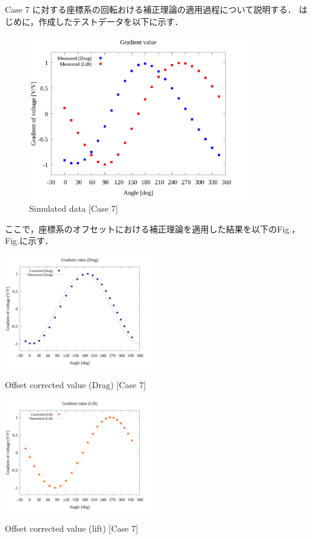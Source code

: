 Case 7 に対する座標系の回転おける補正理論の適用過程について説明する．
はじめに，作成したテストデータを以下に示す．

\begin{figure}[htbp]
    \footnotesize
    \begin{center}
        \includegraphics[width=95mm]{../../02_workspace/result/simulation_tx=10.0_ty=-5.0_dx=5.00_dy=-2.50/plot/05/05_summary-wave.png}
        \caption{Simulated data [Case 7]}
    \end{center}
\end{figure}

ここで，座標系のオフセットにおける補正理論を適用した結果を以下のFig.，Fig.に示す．

\begin{multicols}{2}
    \begin{figure_here}
        \begin{center}
        \includegraphics[width=65mm]{../../02_workspace/result/simulation_tx=10.0_ty=-5.0_dx=5.00_dy=-2.50/plot/21/21-2_corrected_offset_drag.png}
        \caption{Offset corrected value (Drag) [Case 7]}
        \includegraphics[width=65mm]{../../02_workspace/result/simulation_tx=10.0_ty=-5.0_dx=5.00_dy=-2.50/plot/21/21-2_corrected_offset_lift.png}
        \caption{Offset corrected value (lift) [Case 7]}
        \end{center}
    \end{figure_here}
\end{multicols}

